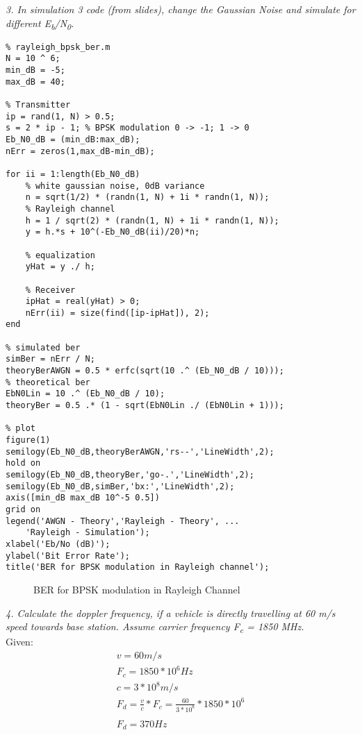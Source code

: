 \documentclass[a4paper]{article}
\begin{document}
\textit{3. In simulation 3 code (from slides), change the Gaussian Noise and simulate for different E\textsubscript b/N\textsubscript0.}\\
\bigskip
\begin{verbatim}
% rayleigh_bpsk_ber.m
N = 10 ^ 6;
min_dB = -5;
max_dB = 40;

% Transmitter
ip = rand(1, N) > 0.5;
s = 2 * ip - 1; % BPSK modulation 0 -> -1; 1 -> 0
Eb_N0_dB = (min_dB:max_dB);
nErr = zeros(1,max_dB-min_dB);

for ii = 1:length(Eb_N0_dB)
    % white gaussian noise, 0dB variance
    n = sqrt(1/2) * (randn(1, N) + 1i * randn(1, N));
    % Rayleigh channel
    h = 1 / sqrt(2) * (randn(1, N) + 1i * randn(1, N));
    y = h.*s + 10^(-Eb_N0_dB(ii)/20)*n;
 
    % equalization
    yHat = y ./ h;
 
    % Receiver
    ipHat = real(yHat) > 0;
    nErr(ii) = size(find([ip-ipHat]), 2);
end

% simulated ber
simBer = nErr / N;
theoryBerAWGN = 0.5 * erfc(sqrt(10 .^ (Eb_N0_dB / 10)));
% theoretical ber
EbN0Lin = 10 .^ (Eb_N0_dB / 10);
theoryBer = 0.5 .* (1 - sqrt(EbN0Lin ./ (EbN0Lin + 1)));

% plot
figure(1)
semilogy(Eb_N0_dB,theoryBerAWGN,'rs--','LineWidth',2);
hold on
semilogy(Eb_N0_dB,theoryBer,'go-.','LineWidth',2);
semilogy(Eb_N0_dB,simBer,'bx:','LineWidth',2);
axis([min_dB max_dB 10^-5 0.5])
grid on
legend('AWGN - Theory','Rayleigh - Theory', ...
    'Rayleigh - Simulation');
xlabel('Eb/No (dB)');
ylabel('Bit Error Rate');
title('BER for BPSK modulation in Rayleigh channel');
\end{verbatim}
\begin{figure}[hbt!]
  \centering
  
  \caption{BER for BPSK modulation in Rayleigh Channel}
\end{figure}

\newpage
\textit{4. Calculate the doppler frequency, if a vehicle is directly travelling at 60 m/s speed towards base station. Assume carrier frequency F\textsubscript c = 1850 MHz.}\\
\bigskip
Given:
\begin{gather*} 
v = 60 m/s\\
F_c = 1850 * 10^6 Hz\\
c = 3 * 10^8 m/s\\
F_d = \frac{v}{c} * F_c
    = \frac{60}{3 * 10^8} * 1850 * 10^6\\
\\
F_d = 370 Hz
\end{gather*}
\end{document}

